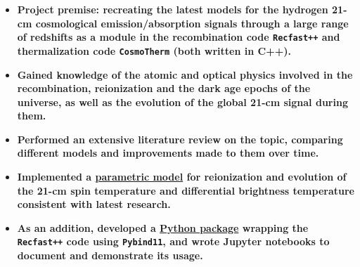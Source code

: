 \documentclass[letterpaper,11pt]{article}
\makeatletter
\newcommand{\resumeItem}[2]{
  \item\small{
    \textbf{#1}{ #2 \vspace{-2pt}}
  }
}
\newcommand{\resumeSubheading}[4]{
  \vspace{-1pt}\item
    \begin{tabular*}{0.97\textwidth}[t]{l@{\extracolsep{\fill}}r}
      \textbf{#1} & #2 \\
      \textit{\small#3} & \textit{\small #4} \\
    \end{tabular*}\vspace{-5pt}
}
\newcommand{\resumeItemListStart}{\begin{itemize}}
\newcommand{\resumeItemListEnd}{\end{itemize}\vspace{-5pt}}
\makeatother
\begin{document}
      \resumeItemListStart
        \resumeItem
          {\normalfont \textbf{Project premise}: recreating the latest models for the hydrogen 21-cm cosmological emission/absorption signals through a large range of redshifts as a module in the recombination code \texttt{Recfast++} and thermalization code \texttt{CosmoTherm} (both written in C++).}{}
        \resumeItem
          {\normalfont Gained knowledge of the atomic and optical physics involved in the recombination, reionization and the dark age epochs of the universe, as well as the evolution of the global 21-cm signal during them.}{}
        \resumeItem
          {\normalfont Performed an extensive literature review on the topic, comparing different models and improvements made to them over time.}{}
        \resumeItem
          {\normalfont Implemented a \href{https://bitbucket.org/Jacetoto/recfast-.vx/src/Recfast_JD_21cm_modelling/}{parametric model} for reionization and evolution of the 21-cm spin temperature and differential brightness temperature consistent with latest research.}{}
        \resumeItem
          {\normalfont As an addition, developed a \href{https://bitbucket.org/Jacetoto/recfast-.vx/src/Python-wrapper/}{Python package} wrapping the \texttt{Recfast++} code using \texttt{Pybind11}, and wrote Jupyter notebooks to document and demonstrate its usage.}{}
      \resumeItemListEnd
      
\begin{comment}  
      \resumeSubheading
      {Pulsar timing experiment}{Manchester, UK}
      {3rd year undergraduate lab experiment}{Mar. 2021 - May 2021}
      \resumeItemListStart
        \resumeItem
          {\normalfont Gained knowledge of the physics involved in the formation, mechanism and turn-off of pulsars.}{}
        \resumeItem
          {\normalfont Gained experience remotely operating the 42ft telescope at JBCA to take pulsar observations and found distances to them using pulse de-dispersion techniques. }{}
        \resumeItem
          {\normalfont Extracted the pulse period of several pulsars in the archived data of the 72m Lovell telescope at JBCA, using Fourier analysis techniques and novel peak-finding algorithms.}{}
      \resumeItemListEnd

      \resumeSubheading
      {Optical tweezers experiment}{Manchester, UK}
      {3rd year undergraduate lab experiment}{Oct. 2020 -- Nov. 2020}
      \resumeItemListStart
        \resumeItem
          {\normalfont Gained experience using a microscope and class 3B laser, for the purpose of optical tweezing, as well as making microscope samples for observation.}{}
        \resumeItem
          {\normalfont Investigated the viscosity of different liquids by studying the effects of piconewton-scale forces on the Brownian motion of silica and polystyrene microbeads in them. Also found the spring constant of the laser as a function of its input power.}{}
        \resumeItem
          {\normalfont Experimented with several particle tracking algorithms, including machine-learning based trackers, to track the microbeads, and advanced statistical techniques like kernel density estimation for data analysis.}{}
      \resumeItemListEnd
    \end{comment}  
\end{document}
